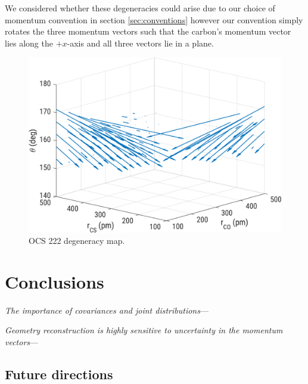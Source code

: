 We considered whether these degeneracies could arise due to our choice of momentum convention in section \ref{sec:conventions} however our convention simply rotates the three momentum vectors such that the carbon's momentum vector lies along the $+x$-axis and all three vectors lie in a plane.

\begin{figure}
  \centering
  \includegraphics[width=\textwidth]{Plots/OCS222DegeneracyMapSD}
  \caption[OCS 222 degeneracy map.]
  {OCS 222 degeneracy map.}
  \label{fig:OCS222DegeneracyMapSD}
\end{figure}


\section{Conclusions}
\emph{The importance of covariances and joint distributions}---

\emph{Geometry reconstruction is highly sensitive to uncertainty in the momentum vectors}---

\subsection{Future directions}